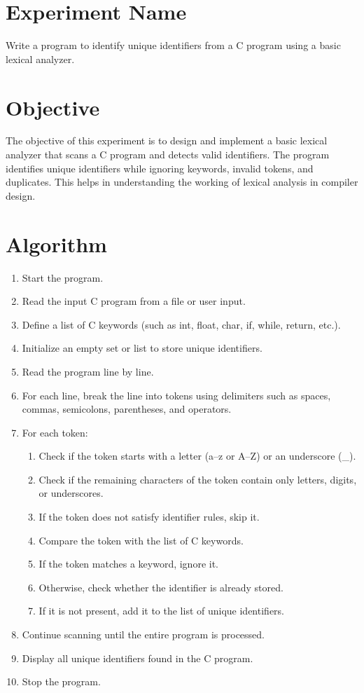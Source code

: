 \documentclass[12pt]{article}
\begin{document}
\vspace{1cm}

\section*{Experiment Name}
Write a program to identify unique identifiers from a C program using a basic lexical analyzer.

\section*{Objective}
The objective of this experiment is to design and implement a basic lexical analyzer that scans a C program and detects valid identifiers. The program identifies unique identifiers while ignoring keywords, invalid tokens, and duplicates. This helps in understanding the working of lexical analysis in compiler design.

\section*{Algorithm}
\begin{enumerate}
    \item Start the program.
    \item Read the input C program from a file or user input.
    \item Define a list of C keywords (such as int, float, char, if, while, return, etc.).
    \item Initialize an empty set or list to store unique identifiers.
    \item Read the program line by line.
    \item For each line, break the line into tokens using delimiters such as spaces, commas, semicolons, parentheses, and operators.
    \item For each token:
    \begin{enumerate}
        \item Check if the token starts with a letter (a--z or A--Z) or an underscore (\_).
        \item Check if the remaining characters of the token contain only letters, digits, or underscores.
        \item If the token does not satisfy identifier rules, skip it.
        \item Compare the token with the list of C keywords.
        \item If the token matches a keyword, ignore it.
        \item Otherwise, check whether the identifier is already stored.
        \item If it is not present, add it to the list of unique identifiers.
    \end{enumerate}
    \item Continue scanning until the entire program is processed.
    \item Display all unique identifiers found in the C program.
    \item Stop the program.
\end{enumerate}
\end{document}

